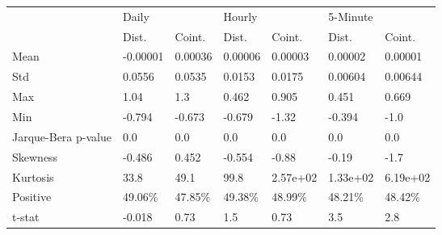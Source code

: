 \begin{tabular}{lllllll}
\toprule
{} & \multicolumn{2}{l}{Daily} & \multicolumn{2}{l}{Hourly} & \multicolumn{2}{l}{5-Minute} \\
{} &     Dist. &   Coint. &    Dist. &    Coint. &     Dist. &    Coint. \\
\midrule
Mean                &  -0.00001 &  0.00036 &  0.00006 &   0.00003 &   0.00002 &   0.00001 \\
Std                 &    0.0556 &   0.0535 &   0.0153 &    0.0175 &   0.00604 &   0.00644 \\
Max                 &      1.04 &      1.3 &    0.462 &     0.905 &     0.451 &     0.669 \\
Min                 &    -0.794 &   -0.673 &   -0.679 &     -1.32 &    -0.394 &      -1.0 \\
Jarque-Bera p-value &       0.0 &      0.0 &      0.0 &       0.0 &       0.0 &       0.0 \\
Skewness            &    -0.486 &    0.452 &   -0.554 &     -0.88 &     -0.19 &      -1.7 \\
Kurtosis            &      33.8 &     49.1 &     99.8 &  2.57e+02 &  1.33e+02 &  6.19e+02 \\
Positive            &   49.06\% &  47.85\% &  49.38\% &   48.99\% &   48.21\% &   48.42\% \\
t-stat              &    -0.018 &     0.73 &      1.5 &      0.73 &       3.5 &       2.8 \\
\bottomrule
\end{tabular}
